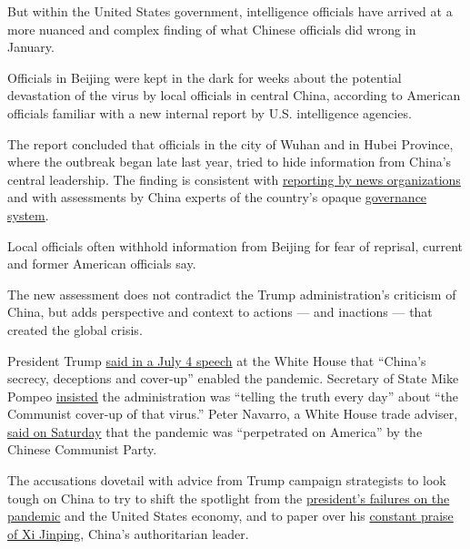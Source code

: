 But within the United States government, intelligence officials have
arrived at a more nuanced and complex finding of what Chinese officials
did wrong in January.

Officials in Beijing were kept in the dark for weeks about the potential
devastation of the virus by local officials in central China, according
to American officials familiar with a new internal report by U.S.
intelligence agencies.

The report concluded that officials in the city of Wuhan and in Hubei
Province, where the outbreak began late last year, tried to hide
information from China's central leadership. The finding is consistent
with
\href{https://www.nytimes3xbfgragh.onion/2020/03/29/world/asia/coronavirus-china.html}{reporting
by news organizations} and with assessments by China experts of the
country's opaque
\href{https://www.nytimes3xbfgragh.onion/2018/01/05/sunday-review/china-military-economic-power.html}{governance
system}.

Local officials often withhold information from Beijing for fear of
reprisal, current and former American officials say.

The new assessment does not contradict the Trump administration's
criticism of China, but adds perspective and context to actions --- and
inactions --- that created the global crisis.

President Trump
\href{https://www.whitehouse.gov/briefings-statements/remarks-president-trump-2020-salute-america/}{said
in a July 4 speech} at the White House that ``China's secrecy,
deceptions and cover-up'' enabled the pandemic. Secretary of State Mike
Pompeo
\href{https://www.state.gov/my-faith-my-work-my-country/}{insisted} the
administration was ``telling the truth every day'' about ``the Communist
cover-up of that virus.'' Peter Navarro, a White House trade adviser,
\href{https://twitter.com/PeterNavarro45/status/1294630610779213824?s=20}{said
on Saturday} that the pandemic was ``perpetrated on America'' by the
Chinese Communist Party.

The accusations dovetail with advice from Trump campaign strategists to
look tough on China to try to shift the spotlight from the
\href{https://www.nytimes3xbfgragh.onion/2020/04/11/us/politics/coronavirus-trump-response.html}{president's
failures on the pandemic} and the United States economy, and to paper
over his
\href{https://www.nytimes3xbfgragh.onion/2020/06/18/us/politics/trump-china-bolton.html}{constant
praise of Xi Jinping}, China's authoritarian leader.

